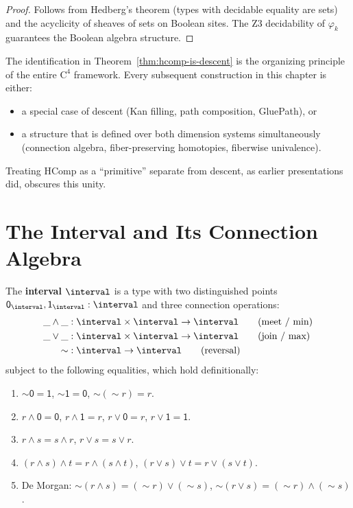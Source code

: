 \begin{proof}
Follows from Hedberg's theorem (types with decidable equality are sets)
and the acyclicity of sheaves of sets on Boolean sites.  The Z3
decidability of $\varphi_k$ guarantees the Boolean algebra structure.
\end{proof}

\begin{remark}
The identification in Theorem~\ref{thm:hcomp-is-descent} is the
organizing principle of the entire $\mathrm{C}^4$ framework.  Every
subsequent construction in this chapter is either:
\begin{itemize}
\item a special case of descent (Kan filling, path composition, GluePath),
  or
\item a structure that is defined over both dimension systems simultaneously
  (connection algebra, fiber-preserving homotopies, fiberwise univalence).
\end{itemize}
Treating HComp as a ``primitive'' separate from descent, as earlier
presentations did, obscures this unity.
\end{remark}


\section{The Interval and Its Connection Algebra}
\label{sec:interval}

\begin{definition}
The \textbf{interval} $\interval$ is a type with two distinguished points
$\mathsf{0}_\interval, \mathsf{1}_\interval : \interval$ and three
connection operations:
\begin{align}
  \_ \wedge \_ &: \interval \times \interval \to \interval
    \tag{meet / min} \\
  \_ \vee \_ &: \interval \times \interval \to \interval
    \tag{join / max} \\
  \sim &: \interval \to \interval
    \tag{reversal}
\end{align}
subject to the following equalities, which hold definitionally:
\begin{enumerate}
\item $\sim \mathsf{0} = \mathsf{1}$, \quad $\sim \mathsf{1} = \mathsf{0}$,
  \quad $\sim(\sim r) = r$.
\item $r \wedge \mathsf{0} = \mathsf{0}$, \quad $r \wedge \mathsf{1} = r$,
  \quad $r \vee \mathsf{0} = r$, \quad $r \vee \mathsf{1} = \mathsf{1}$.
\item $r \wedge s = s \wedge r$, \quad $r \vee s = s \vee r$.
\item $(r \wedge s) \wedge t = r \wedge (s \wedge t)$, \quad
  $(r \vee s) \vee t = r \vee (s \vee t)$.
\item De Morgan: $\sim(r \wedge s) = (\sim r) \vee (\sim s)$, \quad
  $\sim(r \vee s) = (\sim r) \wedge (\sim s)$.
\end{enumerate}
\end{definition}

